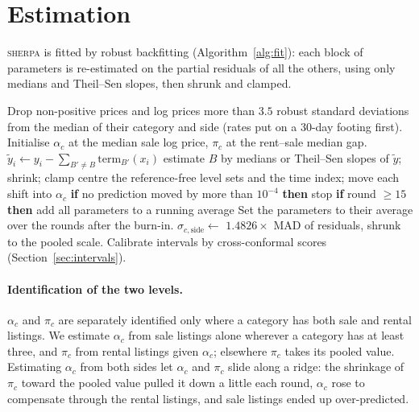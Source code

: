 \documentclass[11pt]{article}
\newcommand{\sherpa}{\textsc{sherpa}}
\begin{document}
\section{Estimation}
\label{sec:estimation}

\sherpa{} is fitted by robust backfitting (Algorithm~\ref{alg:fit}): each block of parameters is
re-estimated on the partial residuals of all the others, using only medians and Theil--Sen slopes,
then shrunk and clamped.

\begin{algorithm}[t]
\caption{Fitting \sherpa}
\label{alg:fit}
\begin{algorithmic}[1]
\State Drop non-positive prices and log prices more than $3.5$ robust standard deviations from the
median of their category and side (rates put on a 30-day footing first).
\State Initialise $\alpha_c$ at the median sale log price, $\pi_c$ at the rent--sale median gap.
    \State $\tilde y_i \gets y_i - \sum_{B'\neq B}\text{term}_{B'}(x_i)$ 
    \State estimate $B$ by medians or Theil--Sen slopes of $\tilde y$; shrink; clamp
  \EndFor
  \State centre the reference-free level sets and the time index; move each shift into $\alpha_c$
  \State \textbf{if} no prediction moved by more than $10^{-4}$ \textbf{then} stop
  \State \textbf{if} round $\ge 15$ \textbf{then} add all parameters to a running average
\EndFor
\State Set the parameters to their average over the rounds after the burn-in.
\State $\sigma_{c,\text{side}} \gets$ $1.4826\times$ MAD of residuals, shrunk to the pooled scale.
\State Calibrate intervals by cross-conformal scores (Section~\ref{sec:intervals}).
\end{algorithmic}
\end{algorithm}

\paragraph{Identification of the two levels.}
$\alpha_c$ and $\pi_c$ are separately identified only where a category has both sale and rental
listings. We estimate $\alpha_c$ from sale listings alone wherever a category has at least three,
and $\pi_c$ from rental listings given $\alpha_c$; elsewhere $\pi_c$ takes its pooled value.
Estimating $\alpha_c$ from both sides let $\alpha_c$ and $\pi_c$ slide along a ridge: the
shrinkage of $\pi_c$ toward the pooled value pulled it down a little each round, $\alpha_c$ rose to
compensate through the rental listings, and sale listings ended up over-predicted.
\end{document}
